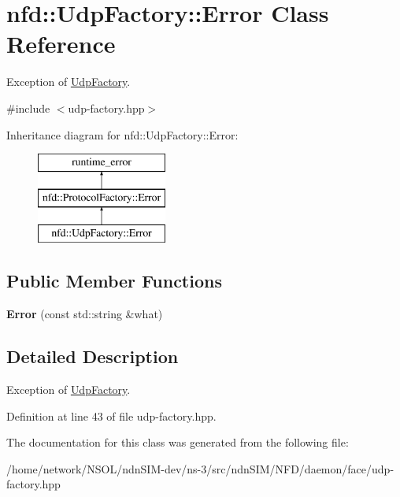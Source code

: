 \hypertarget{classnfd_1_1UdpFactory_1_1Error}{}\section{nfd\+:\+:Udp\+Factory\+:\+:Error Class Reference}
\label{classnfd_1_1UdpFactory_1_1Error}


Exception of \hyperlink{classnfd_1_1UdpFactory}{Udp\+Factory}.  




{\ttfamily \#include $<$udp-\/factory.\+hpp$>$}

Inheritance diagram for nfd\+:\+:Udp\+Factory\+:\+:Error\+:\begin{figure}[H]
\begin{center}
\leavevmode
\includegraphics[height=3.000000cm]{classnfd_1_1UdpFactory_1_1Error}
\end{center}
\end{figure}
\subsection*{Public Member Functions}
\begin{DoxyCompactItemize}
\item 
{\bfseries Error} (const std\+::string \&what)\hypertarget{classnfd_1_1UdpFactory_1_1Error_a4edc6d69e92797227667b0e1e442bb2e}{}\label{classnfd_1_1UdpFactory_1_1Error_a4edc6d69e92797227667b0e1e442bb2e}

\end{DoxyCompactItemize}


\subsection{Detailed Description}
Exception of \hyperlink{classnfd_1_1UdpFactory}{Udp\+Factory}. 

Definition at line 43 of file udp-\/factory.\+hpp.



The documentation for this class was generated from the following file\+:\begin{DoxyCompactItemize}
\item 
/home/network/\+N\+S\+O\+L/ndn\+S\+I\+M-\/dev/ns-\/3/src/ndn\+S\+I\+M/\+N\+F\+D/daemon/face/udp-\/factory.\+hpp\end{DoxyCompactItemize}
